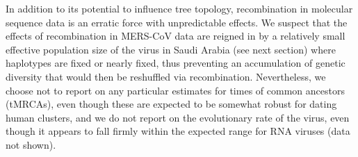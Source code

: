 \documentclass[11pt,oneside,letterpaper]{article}
\begin{document}
In addition to its potential to influence tree topology, recombination in molecular sequence data is an erratic force with unpredictable effects.
We suspect that the effects of recombination in MERS-CoV data are reigned in by a relatively small effective population size of the virus in Saudi Arabia (see next section) where haplotypes are fixed or nearly fixed, thus preventing an accumulation of genetic diversity that would then be reshuffled via recombination.
Nevertheless, we choose not to report on any particular estimates for times of common ancestors (tMRCAs), even though these are expected to be somewhat robust for dating human clusters, and we do not report on the evolutionary rate of the virus, even though it appears to fall firmly within the expected range for RNA viruses (data not shown).


%
\end{document}
